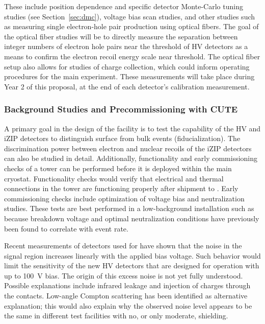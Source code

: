 These include position dependence and specific detector Monte-Carlo tuning studies (see Section~\ref{sec:dmc}), voltage bias scan studies, and other studies such as measuring single electron-hole pair production using optical fibers. 
The goal of the optical fiber studies will be to directly measure the separation between integer numbers of electron hole pairs near the threshold of HV detectors as a means to confirm the electron recoil energy scale near threshold.  The optical fiber setup also allows for studies of charge collection, which could inform operating procedures for the main experiment. These measurements will take place during Year 2 of this proposal, at the end of each detector's calibration measurement. 

\subsubsection{Background Studies and Precommissioning with CUTE}
\label{sec:CUTE}

A primary goal in the design of the \cute facility is to test the capability of the \SuperCDMS HV and iZIP detectors to distinguish surface from bulk events (fiducialization). The discrimination power between electron and nuclear recoils of the \SuperCDMS iZIP detectors can also be studied in detail. Additionally, functionality and early commissioning checks of a tower can be performed before it is deployed within the main \SuperCDMS cryostat.  Functionality checks would verify that electrical and thermal connections in the tower are functioning properly after shipment to \SNOLAB. Early commissioning checks include optimization of voltage bias and neutralization studies.  These tests are best performed in a low-background installation such as \cute because breakdown voltage and optimal neutralization conditions have previously been found to  correlate with event rate.

Recent measurements of detectors used for \SuperCDMS \Soudan have shown that the noise in the signal region increases linearly with the applied bias voltage. Such behavior would limit the sensitivity of the new \SuperCDMS HV detectors that are designed for operation with up to 100~V bias. The origin of this excess noise is not yet fully understood. Possible explanations include infrared leakage and injection of charges through the contacts. Low-angle Compton scattering has been identified as alternative explanation; this would also explain why the observed noise level appears to be the same in different test facilities with no, or only moderate, shielding.

